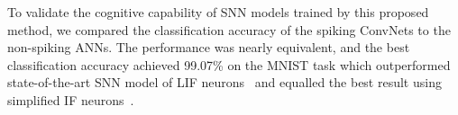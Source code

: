 %	
%	
%	
%	


To validate the cognitive capability of SNN models trained by this proposed method, we compared the classification accuracy of the spiking ConvNets to the non-spiking ANNs.
The performance was nearly equivalent, and the best classification accuracy achieved 99.07\% on the MNIST task which outperformed state-of-the-art SNN model of LIF neurons~\citep{hunsberger2015spiking} and equalled the best result using simplified IF neurons~\citep{diehl2015fast}.


